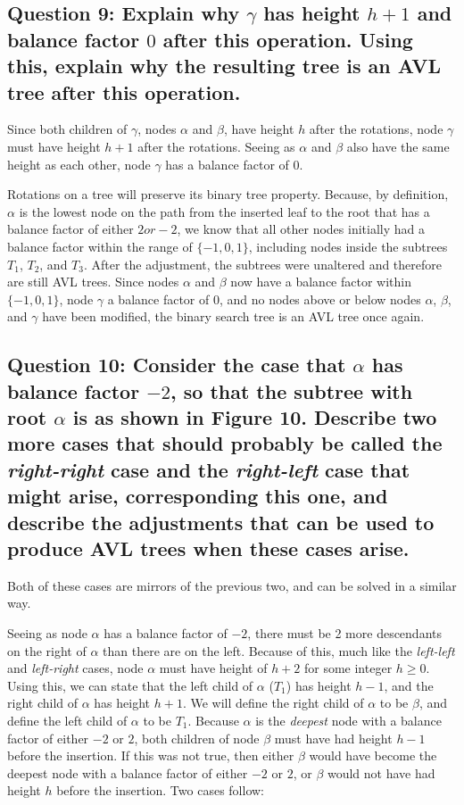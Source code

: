 \documentclass[a4paper, 12pt, titlepage]{article}
\begin{document}
\subsection*{Question 9: Explain why $\gamma$ has height $h+1$ and balance factor $0$ after this operation. Using this, explain why the resulting tree is an AVL tree after this operation.} 

Since both children of $\gamma$,
nodes $\alpha$ and $\beta$,
have height $h$ after the rotations,
node $\gamma$ must have height $h+1$ after the rotations.
Seeing as $\alpha$ and $\beta$ also have the same height as each other,
node $\gamma$ has a balance factor of $0$.

Rotations on a tree will preserve its binary tree property.
Because,
by definition,
$\alpha$ is the lowest node on the path from the inserted leaf to the root that has a balance factor of either $2 or -2$,
we know that all other nodes initially had a balance factor within the range of $\{-1, 0, 1\}$,
including nodes inside the subtrees $T_1$, $T_2$, and $T_3$.
After the adjustment,
the subtrees were unaltered and therefore are still AVL trees.
Since nodes $\alpha$ and $\beta$ now have a balance factor within $\{-1, 0, 1\}$,
node $\gamma$ a balance factor of $0$,
and no nodes above or below nodes $\alpha$, $\beta$, and $\gamma$ have been modified,
the binary search tree is an AVL tree once again.

\subsection*{Question 10: Consider the case that $\alpha$ has balance factor $-2$, so that the subtree with root $\alpha$ is as shown in Figure 10. Describe two more cases that should probably be called the \textit{right-right} case and the \textit{right-left} case that might arise, corresponding this one, and describe the adjustments that can be used to produce AVL trees when these cases arise.} 

Both of these cases are mirrors of the previous two,
and can be solved in a similar way.

Seeing as node $\alpha$ has a balance factor of $-2$,
there must be 2 more descendants on the right of $\alpha$ than there are on the left.
Because of this,
much like the \textit{left-left} and \textit{left-right} cases,
node $\alpha$ must have height of $h+2$ for some integer $h\geq{}0$.
Using this,
we can state that the left child of $\alpha$
($T_1$)
has height $h-1$,
and the right child of $\alpha$ has height $h+1$.
We will define the right child of $\alpha$ to be $\beta$,
and define the left child of $\alpha$ to be $T_1$.
Because $\alpha$ is the \textit{deepest} node with a balance factor of either $-2$ or $2$,
both children of node $\beta$ must have had height $h-1$ before the insertion.
If this was not true,
then either $\beta$ would have become the deepest node with a balance factor of either $-2$ or $2$,
or $\beta$ would not have had height $h$ before the insertion.
Two cases follow:
\end{document}
